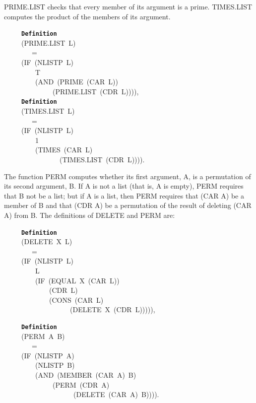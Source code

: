 \documentclass[11pt]{book}
\newenvironment{pubasis}{\begin{flushleft}\ttfamily\small}{\normalsize\rmfamily\end{flushleft}}
\newcommand{\axiomordefinition}[1]{\vspace{6pt}\texttt{\textbf{#1}}}
\begin{document}
PRIME.LIST checks that every member of its argument
is a prime.  TIMES.LIST computes the product of the members of 
its argument.
\begin{pubasis}
~~~~~\axiomordefinition{Definition}\\
~~~~~(PRIME.LIST~L)\\
~~~~~~~~=\\
~~~~~(IF~(NLISTP~L)\\
~~~~~~~~~T\\
~~~~~~~~~(AND~(PRIME~(CAR~L))\\
~~~~~~~~~~~~~~(PRIME.LIST~(CDR~L)))),\\

~~~~~\axiomordefinition{Definition}\\
~~~~~(TIMES.LIST~L)\\
~~~~~~~~=\\
~~~~~(IF~(NLISTP~L)\\
~~~~~~~~~1\\
~~~~~~~~~(TIMES~(CAR~L)\\
~~~~~~~~~~~~~~~~(TIMES.LIST~(CDR~L)))).\\
\end{pubasis}
The function PERM computes whether its first argument, A, is
a permutation of its second argument, B.  If A is
not a list (that is, A is empty),  PERM
requires that   B not be  a list; but if 
A is a list, then PERM requires that (CAR A)
be a member of B and that (CDR A) be a permutation of
the result of deleting (CAR A) from B.
The definitions of DELETE and PERM are:
\begin{pubasis}
~~~~~\axiomordefinition{Definition}\\
~~~~~(DELETE~X~L)\\
~~~~~~~~=\\
~~~~~(IF~(NLISTP~L)\\
~~~~~~~~~L\\
~~~~~~~~~(IF~(EQUAL~X~(CAR~L))\\
~~~~~~~~~~~~~(CDR~L)\\
~~~~~~~~~~~~~(CONS~(CAR~L)\\
~~~~~~~~~~~~~~~~~~~(DELETE~X~(CDR~L))))),\\
\end{pubasis}
\begin{pubasis}
~~~~~\axiomordefinition{Definition}\\
~~~~~(PERM~A~B)\\
~~~~~~~~=\\
~~~~~(IF~(NLISTP~A)\\
~~~~~~~~~(NLISTP~B)\\
~~~~~~~~~(AND~(MEMBER~(CAR~A)~B)\\
~~~~~~~~~~~~~~(PERM~(CDR~A)\\
~~~~~~~~~~~~~~~~~~~~(DELETE~(CAR~A)~B)))).\\
\end{pubasis}
\end{document}
